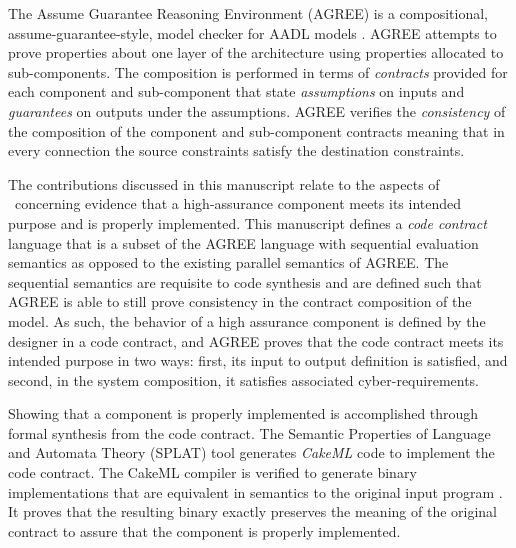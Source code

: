 The Assume Guarantee Reasoning Environment (AGREE) is a compositional, assume-guarantee-style, model checker for AADL models \cite{compositional-analysis-agree,nfm:agree}. 
AGREE attempts to prove properties about one layer of the architecture using properties allocated to sub-components.
The composition is performed in terms of \emph{contracts} provided for each component and sub-component that state \emph{assumptions} on inputs and \emph{guarantees} on outputs under the assumptions.
AGREE verifies the \emph{consistency} of the composition of the component and sub-component contracts meaning that in every connection the source constraints satisfy the destination constraints.

The contributions discussed in this manuscript relate to the aspects of \brfcs\ concerning evidence that a high-assurance component meets its intended purpose and is properly implemented.
This manuscript defines a \emph{code contract} language that is a subset of the AGREE language with sequential evaluation semantics as opposed to the existing parallel semantics of AGREE.
The sequential semantics are requisite to code synthesis and are defined such that AGREE is able to still prove consistency in the contract composition of the model. 
As such, the behavior of a high assurance component is defined by the designer in a code contract, and AGREE proves that the code contract meets its intended purpose in two ways: first, its input to output definition is satisfied, and second, in the system composition, it satisfies associated cyber-requirements.

Showing that a component is properly implemented is accomplished through formal synthesis from the code contract.
The Semantic Properties of Language and Automata Theory (SPLAT) tool generates \emph{CakeML} code to implement the code contract.
The CakeML compiler is verified to generate binary implementations that are equivalent in semantics to the original input program \cite{cakeml}.
It proves that the resulting binary exactly preserves the meaning of the original contract to assure that the component is properly implemented.